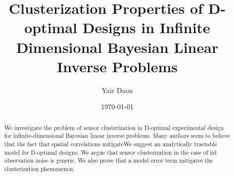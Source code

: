 \documentclass{amsart}
\numberwithin{equation}{section}
\begin{document}
\title[Clusterization Properties of D-optimal Designs]{Clusterization
  Properties of D-optimal Designs in Infinite Dimensional Bayesian
  Linear Inverse Problems}

\author{Yair Daon}
\address{Porter School of the Environment and Earth
  Sciences, Tel Aviv University\\ Tel Aviv, Israel}

\date{\today}

\begin{abstract}
  We investigate the problem of sensor clusterization in D-optimal
  experimental design for infinite-dimensional Bayesian linear inverse
  problems. Many authors seem to believe that the fact that spatial
  correlations mitigateWe suggest an analytically tractable model for D-optimal
  designs. We argue that sensor clusterization in the case of iid
  observation noise is generic. We also prove that a model error term
  mitigates the clusterization phenomenon.

\end{abstract}

\maketitle








\end{document}
